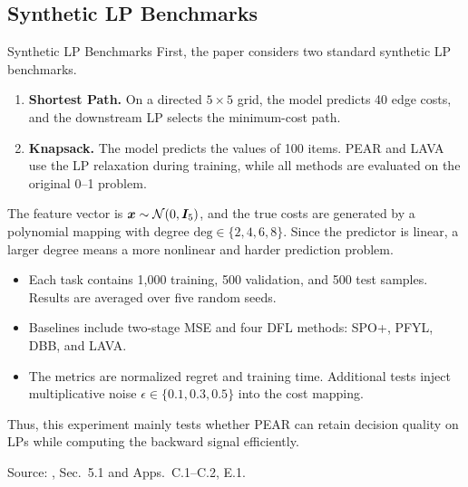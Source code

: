 \subsection{Synthetic LP Benchmarks}

\begin{frame}{Synthetic LP Benchmarks}
    First, the paper considers two standard synthetic LP benchmarks.

    \begin{enumerate}
        \item \textbf{Shortest Path.} On a directed $5\times5$ grid, the model predicts 40 edge costs, and the downstream LP selects the minimum-cost path.
        \item \textbf{Knapsack.} The model predicts the values of 100 items. PEAR and LAVA use the LP relaxation during training, while all methods are evaluated on the original 0--1 problem.
    \end{enumerate}

    The feature vector is ${\bm{x}}\sim\mathcal N(0,{\bm{I}}_5)$, and the true costs are generated by a polynomial mapping with degree $\mathrm{deg}\in\{2,4,6,8\}$. Since the predictor is linear, a larger degree means a more nonlinear and harder prediction problem.

    \begin{itemize}
        \item Each task contains 1,000 training, 500 validation, and 500 test samples. Results are averaged over five random seeds.
        \item Baselines include two-stage MSE and four DFL methods: SPO+, PFYL, DBB, and LAVA.
        \item The metrics are normalized regret and training time. Additional tests inject multiplicative noise $\epsilon\in\{0.1,0.3,0.5\}$ into the cost mapping.
    \end{itemize}

    Thus, this experiment mainly tests whether PEAR can retain decision quality on LPs while computing the backward signal efficiently.

    \vfill
    {\tiny Source: \citet{lee2026decisionfocusedlearningtangentspaceprojection}, Sec.~5.1 and Apps.~C.1--C.2, E.1.}
\end{frame}

